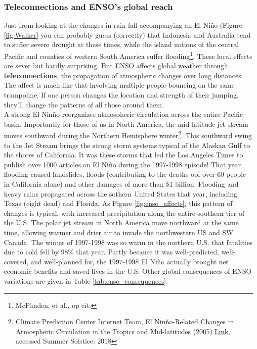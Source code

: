 {\subsubsection{Teleconnections and ENSO's global reach}
Just from looking at the changes in rain fall accompanying an El Ni\~no (Figure \ref{fig:Walker} you can probably guess (correctly) that Indonesia and Australia tend to suffer severe drought at these times, while the island nations of the central Pacific and counties of western South America suffer flooding\footnote{McPhaden, et al., op cit.}. These local effects are sever but hardly surprising. But ENSO affects global weather through \textbf{teleconnections}, the propagation of atmospheric changes over long distances. The affect is much like that involving multiple people bouncing on the same trampoline. If one person changes the location and strength of their jumping, they'll change the patterns of all those around them.\\
A strong El Nin\~no reorganizes atmospheric circulation across the entire Pacific basin. Importantly for those of us in North America, the mid-latitude jet stream moves southward during the Northern Hemisphere winter\footnote{Climate Prediction Center Internet Team, El Nin\~no-Related Changes in Atmospheric Circulation in the Tropics and Mid-latitudes (2005) \href{http://www.cpc.ncep.noaa.gov/products/analysis_monitoring/ensocycle/enso_circ.shtml}{Link}, accessed Summer Solstice, 2018}. This southward swing to the Jet Stream brings the strong storm systems typical of the Alaskan Gulf to the shores of California. It was these storms that led the Los Angeles Times to publish over 1000 articles on El Ni\~no during the 1997-1998 episode! That year flooding caused landslides, floods (contributing to the deaths oof over 60 people in California alone) and other damages of more than \$1 billion. Flooding and heavy rains propagated across the sothern United States that year, including Texas (eight dead) and Florida. As Figure \ref{fig:enso_affects}, this pattern of changes is typical, with increased precipitation along the entire southern tier of the U.S. The polar jet stream in North America move northward at the same time, allowing warmer and drier air to invade the northwestern US and SW Canada. The winter of 1997-1998 was so warm in the northern U.S. that fatalities due to cold fell by 98\% that year. Partly because it was well-predicted, well-covered, and well-planned for, the 1997-1998 El Ni\~no actually brought net economic benefits and saved lives in the U.S. Other global consequences of ENSO variations are given in Table \ref{tab:enso_consequences}. \\

}
